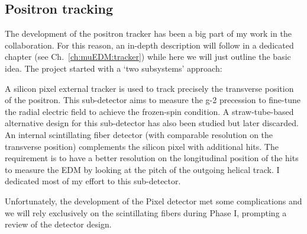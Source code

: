 \begin{refsection}
    \subsection{Positron tracking}
        The development of the positron tracker has been a big part of my work in the collaboration.
        For this reason, an in-depth description will follow in a dedicated chapter (see Ch.~\ref{ch:muEDM:tracker}) while here we will just outline the basic idea.
        The project started with a `two subsystems' approach:
        \begin{outline}
            \1 A silicon pixel external tracker is used to track precisely the transverse position of the positron. 
            This sub-detector aims to measure the g-2 precession to fine-tune the radial electric field to achieve the frozen-spin condition.
            A straw-tube-based alternative design for this sub-detector has also been studied but later discarded.
            \1 An internal scintillating fiber detector (with comparable resolution on the transverse position) complements the silicon pixel with additional hits. 
            The requirement is to have a better resolution on the longitudinal position of the hits to measure the EDM by looking at the pitch of the outgoing helical track.
            I dedicated most of my effort to this sub-detector.
        \end{outline}
        Unfortunately, the development of the Pixel detector met some complications and we will rely exclusively on the scintillating fibers during Phase I, prompting a review of the detector design.  


\end{refsection}
